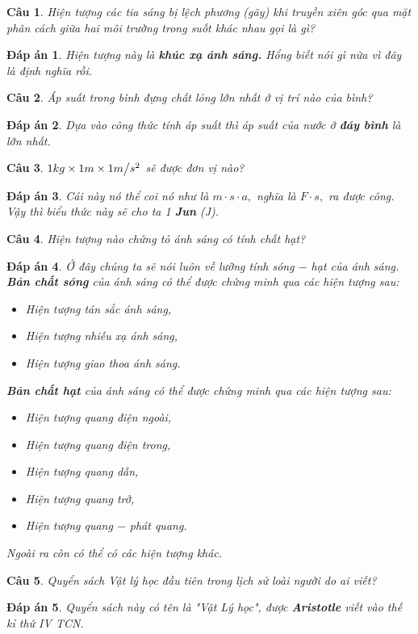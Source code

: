\documentclass[12pt,a4paper]{article}
\newtheorem{ques}{Câu}
\theoremstyle{nonumberplain}
\newtheorem{ans}{Đáp án}
\begin{document}
\begin{ques}
Hiện tượng các tia sáng bị lệch phương (gãy) khi truyền xiên góc qua mặt phân cách giữa hai môi trường trong suốt khác nhau gọi là gì?
\end{ques}
\begin{mybox} \begin{ans}
Hiện tượng này là \textbf{khúc xạ ánh sáng.} Hổng biết nói gì nữa vì đây là định nghĩa rồi.
\end{ans} \end{mybox}
\begin{ques}
Áp suất trong bình đựng chất lỏng lớn nhất ở vị trí nào của bình?
\end{ques}
\begin{mybox} \begin{ans}
Dựa vào công thức tính áp suất thì áp suất của nước ở \textbf{đáy bình} là lớn nhất.
\end{ans} \end{mybox}
\begin{ques}
\(1kg \times 1m \times 1{m \mathord{\left/
 {\vphantom {m {{s^2}}}} \right.
 \kern-\nulldelimiterspace} {{s^2}}}\) sẽ được đơn vị nào?
\end{ques}
\begin{mybox} \begin{ans}
Cái này nó thể coi nó như là \(m \cdot s \cdot a,\) nghĩa là \(F \cdot s,\) ra được công.\\
Vậy thì biểu thức này sẽ cho ta 1 \textbf{Jun} (J).
\end{ans} \end{mybox}
\begin{ques}
Hiện tượng nào chứng tỏ ánh sáng có tính chất hạt?
\end{ques}
\begin{mybox} \begin{ans}
Ở đây chúng ta sẽ nói luôn về lưỡng tính sóng \(-\) hạt của ánh sáng.\\
\textbf{Bản chất sóng} của ánh sáng có thể được chứng minh qua các hiện tượng sau:
\begin{itemize}
\item Hiện tượng tán sắc ánh sáng,
\item Hiện tượng nhiễu xạ ánh sáng,
\item Hiện tượng giao thoa ánh sáng.
\end{itemize}
\textbf{Bản chất hạt} của ánh sáng có thể được chứng minh qua các hiện tượng sau:
\begin{itemize}
\item Hiện tượng quang điện ngoài,
\item Hiện tượng quang điện trong,
\item Hiện tượng quang dẫn,
\item Hiện tượng quang trở,
\item Hiện tượng quang \(-\) phát quang.
\end{itemize}
Ngoài ra còn có thể có các hiện tượng khác.
\end{ans} \end{mybox}
\begin{ques}
Quyển sách Vật lý học đầu tiên trong lịch sử loài người do ai viết?
\end{ques}
\begin{mybox} \begin{ans}
Quyển sách này có tên là \textit{"Vật Lý học"}, được \textbf{Aristotle} viết vào thế kỉ thứ IV TCN.
\end{ans} \end{mybox}
\end{document}
